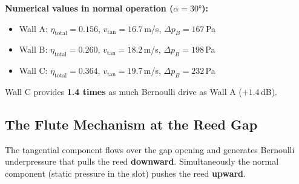 \documentclass[11pt,a4paper]{article}
\begin{document}
\begin{table}[H]
\centering\small
{}
\caption{Bernoulli suction at gap for various entry angles and wall shapes. Fraction relative to $\Delta p_{B,\text{max}} = \tfrac{1}{2}\rho v_\text{gap}^2 = 499$\,Pa (if 100\,\% tangential).}
\end{table}

\textbf{Numerical values in normal operation ($\alpha = 30°$):}
\begin{itemize}[leftmargin=5mm]
\item Wall A: $\eta_\text{total} = 0.156$, $v_\text{tan} = 16.7$\,m/s, $\Delta p_B = 167$\,Pa
\item Wall B: $\eta_\text{total} = 0.260$, $v_\text{tan} = 18.2$\,m/s, $\Delta p_B = 198$\,Pa
\item Wall C: $\eta_\text{total} = 0.364$, $v_\text{tan} = 19.7$\,m/s, $\Delta p_B = 232$\,Pa
\end{itemize}
Wall C provides \textbf{1.4 times} as much Bernoulli drive as Wall A ($+1.4$\,dB).

\subsection{The Flute Mechanism at the Reed Gap}

The tangential component flows over the gap opening and generates Bernoulli underpressure that pulls the reed \textbf{downward}. Simultaneously the normal component (static pressure in the slot) pushes the reed \textbf{upward}.
\end{document}
